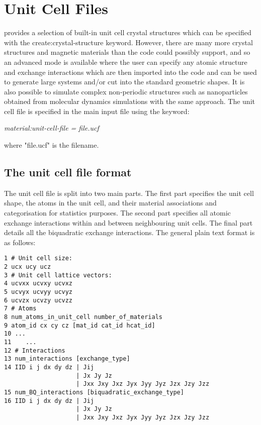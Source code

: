 \chapter{Unit Cell Files}\label{chap:unitcellfiles}
\vampire provides a selection of built-in unit cell crystal structures which can
be specified with the create:crystal-structure keyword. However, there are many
more crystal structures and magnetic materials than the code could possibly
support, and so an advanced mode is available where the user can specify any
atomic structure and exchange interactions which are then imported into the code
and can be used to generate large systems and/or cut into the standard geometric
shapes. It is also possible to simulate complex non-periodic structures such as
nanoparticles obtained from molecular dynamics simulations with the same
approach. The unit cell file is specified in the main input file using the
keyword:

\noindent\textit{material:unit-cell-file = file.ucf}

\noindent where "file.ucf" is the filename.

\section*{The unit cell file format}
The unit cell file is split into two main parts. The first part specifies the
unit cell shape, the atoms in the unit cell, and their material associations and
categorisation for statistics purposes. The second part specifies all atomic
exchange interactions within and between neighbouring unit cells. The final part
details all the biquadratic exchange interactions. The general plain text format
is as follows:

\begin{verbatim}
1 # Unit cell size:
2 ucx ucy ucz
3 # Unit cell lattice vectors:
4 ucvxx ucvxy ucvxz
5 ucvyx ucvyy ucvyz
6 ucvzx ucvzy ucvzz
7 # Atoms
8 num_atoms_in_unit_cell number_of_materials
9 atom_id cx cy cz [mat_id cat_id hcat_id]
10 ...
11    ...
12 # Interactions
13 num_interactions [exchange_type]
14 IID i j dx dy dz | Jij
                    | Jx Jy Jz
                    | Jxx Jxy Jxz Jyx Jyy Jyz Jzx Jzy Jzz
15 num_BQ_interactions [biquadratic_exchange_type]
16 IID i j dx dy dz | Jij
                    | Jx Jy Jz
                    | Jxx Jxy Jxz Jyx Jyy Jyz Jzx Jzy Jzz

\end{verbatim}

